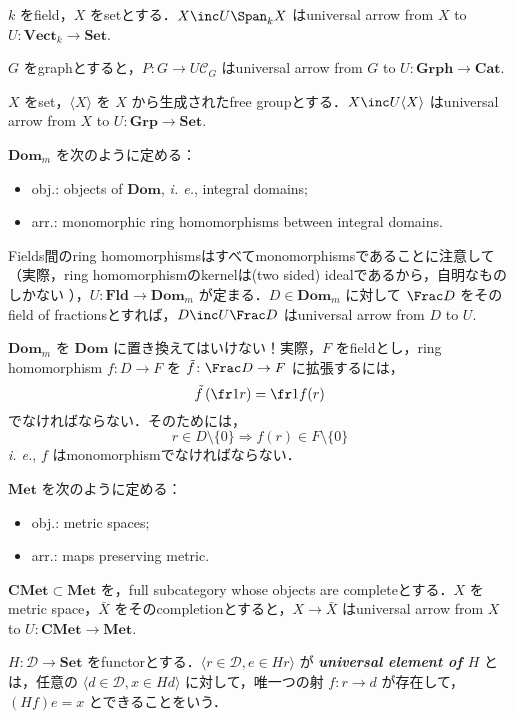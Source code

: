 \documentclass{naughieLuatex}
\newcommand\cat\mathscr
\renewcommand\defterm[1]{ \index{#1}\textbf{\emph{#1}} }
\newcommand\opair[2]{\langle #1, #2 \rangle}
\newcommand\ext\tilde
\newcommand\genby[1]{\langle #1 \rangle}
\newcommand\thatis{\emph{i. e.}}
\newcommand\catb\mathbf
\newcommand\Vect{\catb{Vect}}
\newcommand\Set{\catb{Set}}
\newcommand\Grp{\catb{Grp}}
\newcommand\Grph{\catb{Grph}}
\newcommand\Cat{\catb{Cat}}
\newcommand\Dom{\catb{Dom}}
\newcommand\Fld{\catb{Fld}}
\newcommand\Met{\catb{Met}}
\newcommand\CMet{\catb{CMet}}
\begin{document}
\begin{exs}
\item $k$ をfield，$X$ をsetとする．$X \inc U \Span_k X$ はuniversal arrow from $X$ to $U \colon \Vect_k \to \Set$.
\item $G$ をgraphとすると，$P \colon G \to U \cat C_G$ はuniversal arrow from $G$ to $U \colon \Grph \to \Cat$.
\item $X$ をset，$\genby X$ を $X$ から生成されたfree groupとする．$X \inc U \genby X$ はuniversal arrow from $X$ to $U \colon \Grp \to \Set$.
\item $\Dom_m$ を次のように定める：
  \begin{itemize}
    \item obj.: objects of $\Dom$, \thatis, integral domains;
    \item arr.: monomorphic ring homomorphisms between integral domains.
  \end{itemize}
  Fields間のring homomorphismsはすべてmonomorphismsであることに注意して（実際，ring homomorphismのkernelは(two sided) idealであるから，自明なものしかない ），$U \colon \Fld \to \Dom_m$ が定まる．$D \in \Dom_m$ に対して $\Frac D$ をそのfield of fractionsとすれば，$D \inc U \Frac D$ はuniversal arrow from $D$ to $U$.
  \begin{rem}
    $\Dom_m$ を $\Dom$ に置き換えてはいけない！実際，$F$ をfieldとし，ring homomorphism $f \colon D \to F$ を $\ext f \colon \Frac D \to F$ に拡張するには，
    \[
      \ext f \left( \fr 1r \right) = \fr 1{f (r)}
    \]
    でなければならない．そのためには，
    \[
      r \in D \setminus \{0\} \Longrightarrow f (r) \in F \setminus \{0\}
    \]
    \thatis, $f$ はmonomorphismでなければならない．
  \end{rem}
\item $\Met$ を次のように定める：
  \begin{itemize}
    \item obj.: metric spaces;
    \item arr.: maps preserving metric.
  \end{itemize}
  $\CMet \subset \Met$ を，full subcategory whose objects are completeとする．$X$ をmetric space，$\bar X$ をそのcompletionとすると，$X \to \bar X$ はuniversal arrow from $X$ to $U \colon \CMet \to \Met$.
\end{exs}

\begin{define}
  $H \colon \cat D \to \Set$ をfunctorとする．$\opair{r \in \cat D}{e \in H r}$ が\defterm{universal element of $H$}とは，任意の $\opair{d \in \cat D}{x \in H d}$ に対して，唯一つの射 $f \colon r \to d$ が存在して，$(H f) e = x$ とできることをいう．
\end{define}
\end{document}
